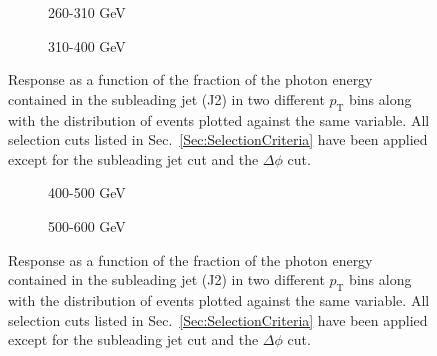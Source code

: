 \begin{figure}[!ht]
  \centering
  \begin{subfigure}{.5\textwidth}
    \centering
    \caption{260-310 GeV}
  \end{subfigure}%
  \begin{subfigure}{.5\textwidth}
    \centering
    \caption{310-400 GeV}
  \end{subfigure}
  \caption[Response as a function of the subleading jet cut, 260-310 and 310-200 GeV bins]
  {\small Response as a function of the fraction of the photon energy contained in the subleading jet (J2) in two different $p_{\mathrm T}$ bins along with the distribution of events plotted against the same variable.  All selection cuts listed in Sec.~\ref{Sec:SelectionCriteria} have been applied except for the subleading jet cut and the $\Delta\phi$ cut.  }
  \label{plot:GJetEMJ2260-310_2016App}
\end{figure}

\begin{figure}[!ht]
  \centering
  \begin{subfigure}{.5\textwidth}
    \centering
    \caption{400-500 GeV}
  \end{subfigure}%
  \begin{subfigure}{.5\textwidth}
    \centering
    \caption{500-600 GeV}
  \end{subfigure}
  \caption[Response as a function of the subleading jet cut, 400-500 and 500-600 GeV bins]
  {\small Response as a function of the fraction of the photon energy contained in the subleading jet (J2) in two different $p_{\mathrm T}$ bins along with the distribution of events plotted against the same variable.  All selection cuts listed in Sec.~\ref{Sec:SelectionCriteria} have been applied except for the subleading jet cut and the $\Delta\phi$ cut.  }
  \label{plot:GJetEMJ2400-500_2016App}
\end{figure}

